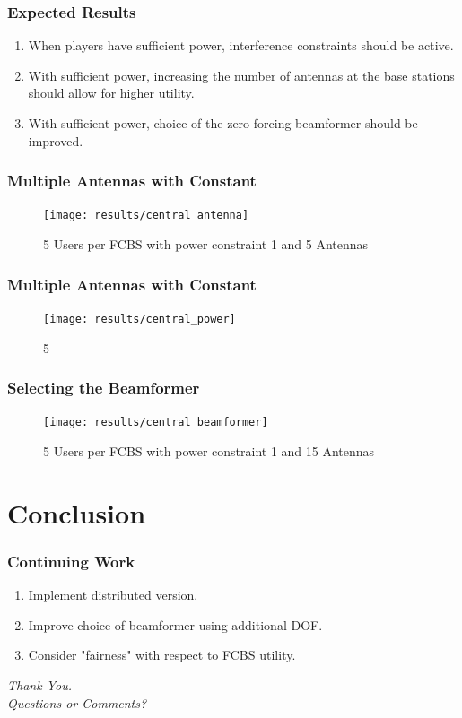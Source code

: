 \documentclass[10pt,tgadventor, onlymath]{beamer}
\begin{document}
\begin{frame}
\frametitle{Expected Results}
\begin{enumerate}
\item
	When players have sufficient power, interference constraints should be active.
\item
	With sufficient power, increasing the number of antennas at the base stations should allow for higher utility.
\item
	With sufficient power, choice of the zero-forcing beamformer should be improved. 
\end{enumerate}
\end{frame}


\begin{frame}
\frametitle{Multiple Antennas with Constant}
\begin{figure}
	\texttt{[image: results/central\_antenna]}
	\caption{5 Users per FCBS with power constraint 1 and 5 Antennas}
\end{figure}
\end{frame}

\begin{frame}
\frametitle{Multiple Antennas with Constant}
\begin{figure}
	\texttt{[image: results/central\_power]}
	\caption{5}
\end{figure}
\end{frame}

\begin{frame}
\frametitle{Selecting the Beamformer}
\begin{figure}
	\texttt{[image: results/central\_beamformer]}
\caption{5 Users per FCBS with power constraint 1 and 15 Antennas }
\end{figure}
\end{frame}

\section{Conclusion}
\begin{frame}
\frametitle{Continuing Work}
\begin{enumerate}
\item
	Implement distributed version.
\item
	Improve choice of beamformer using additional DOF. 
\item
	Consider "fairness" with respect to FCBS utility.
\end{enumerate}
\end{frame}

\begin{frame}
  \centering \Large
  \emph{Thank You.}
  \\
	\bigskip
    \centering \Large
  \emph{Questions or Comments?}
\end{frame}
\end{document}

